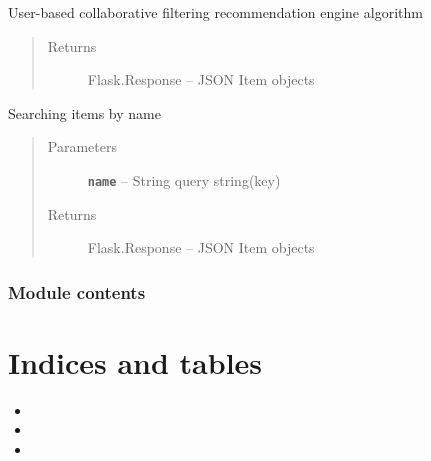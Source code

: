 \documentclass[letterpaper,10pt,english]{sphinxmanual}
\begin{document}

\begin{fulllineitems}
\label{app:app.views.recommend}
User-based collaborative filtering recommendation engine algorithm
\begin{quote}\begin{description}
\item[{Returns}] \leavevmode
Flask.Response -- JSON Item objects

\end{description}\end{quote}

\end{fulllineitems}


\begin{fulllineitems}
\label{app:app.views.search}
Searching items by name
\begin{quote}\begin{description}
\item[{Parameters}] \leavevmode
\textbf{\texttt{name}} -- String query string(key)

\item[{Returns}] \leavevmode
Flask.Response -- JSON Item objects

\end{description}\end{quote}

\end{fulllineitems}



\section{Module contents}
\label{app:module-contents}\label{app:module-app}

\part{Indices and tables}
\label{index:indices-and-tables}\begin{itemize}
\item {} 

\item {} 

\item {} 

\end{itemize}



\renewcommand{\indexname}{Index}
\printindex
\end{document}
